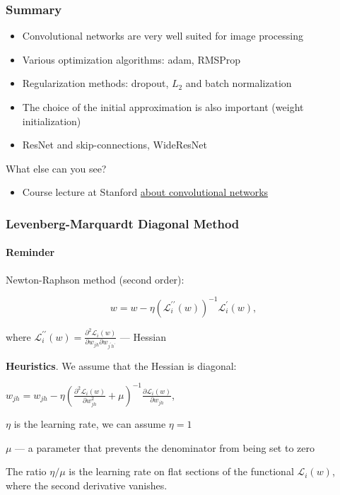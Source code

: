 \documentclass[fullscreen=true, bookmarks=true, hyperref={pdfencoding=unicode}]{beamer}
\begin{document}
\begin{frame}
  \frametitle{Summary}
   \begin{itemize}
     \item Convolutional networks are very well suited for image processing
     \item Various optimization algorithms: adam, RMSProp
     \item Regularization methods: dropout, $L_2$ and batch normalization
     \item The choice of the initial approximation is also important (weight initialization)
     \item ResNet and skip-connections, WideResNet
   \end{itemize}

   \pause
   What else can you see?
   \begin{itemize}
     \item Course lecture at Stanford \href{https://www.youtube.com/watch?v=DAOcjicFr1Y}{about convolutional networks}
   \end{itemize}
\end{frame}


\begin{frame}
  \frametitle{Levenberg-Marquardt Diagonal Method}
  \framesubtitle{Reminder}
  Newton-Raphson method (second order):

  $$ w = w - \eta(\mathcal{L}^{\prime\prime}_i(w))^{-1} \mathcal{L}^{\prime}_i(w),$$

  where $\mathcal{L}^{\prime\prime}_i(w) = 
  \frac{
  \partial^2 \mathcal{L}_i(w)}
  {\partial w_{jh} \partial w_{j^\prime h^\prime}}$ — Hessian

  {\bf Heuristics}. We assume that the Hessian is diagonal:

    $w_{jh} = w_{jh} - \eta \left(\frac{\partial^2 \mathcal{L}_i(w)}{\partial w^2_{jh}} + \mu \right)^{-1} \frac{\partial \mathcal{L}_i(w)}{\partial w_{jh}}$,

    $\eta$ is the learning rate, we can assume $\eta = 1$

    $\mu$ — a parameter that prevents the denominator from being set to zero

    The ratio $\eta/\mu$ is the learning rate on flat sections of the functional $\mathcal{L}_i(w)$, where the second derivative vanishes.
\end{frame}
\end{document}
